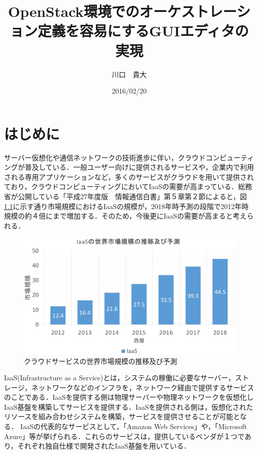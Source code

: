 \documentclass[mingoth]{kut-paper}		%
\title{OpenStack環境でのオーケストレーション定義を容易にするGUIエディタの実現}
\author{川口　貴大}
\date{2016/02/20}
\begin{document}
\maketitle

\chapter{はじめに}
%
	
	サーバー仮想化や通信ネットワークの技術進歩に伴い，クラウドコンピューティングが普及している．一般ユーザー向けに提供されるサービスや，企業内で利用される専用アプリケーションなど，多くのサービスがクラウドを用いて提供されており，クラウドコンピューティングにおいてIaaSの需要が高まっている．総務省が公開している「平成27年度版　情報通信白書」第５章第２節によると，図\ref{graf:1}に示す通り市場規模におけるIaaSの規模が，2018年時予測の段階で2012年時規模の約４倍にまで増加する．\cite{bib:1}そのため，今後更にIaaSの需要が高まると考えられる．
	\begin{figure}[H]
		\begin{center}
			\includegraphics[scale=0.4]{Document/IaaSGrafNew.eps}
			\caption{クラウドサービスの世界市場規模の推移及び予測}
			\label{graf:1}
		\end{center}
	\end{figure}
	
	IaaS(Infrastructure as a Service)とは，システムの稼働に必要なサーバー，ストレージ，ネットワークなどのインフラを，ネットワーク経由で提供するサービスのことである\cite{bib:2}．IaaSを提供する側は物理サーバーや物理ネットワークを仮想化しIaaS基盤を構築してサービスを提供する．IaaSを提供される側は，仮想化されたリソースを組み合わせシステムを構築，サービスを提供させることが可能となる．
	IaaSの代表的なサービスとして，「Amazon Web Services」や，「Microsoft Azure」等が挙げられる．これらのサービスは，提供しているベンダが１つであり，それぞれ独自仕様で開発されたIaaS基盤を用いている．
	
\end{document}
